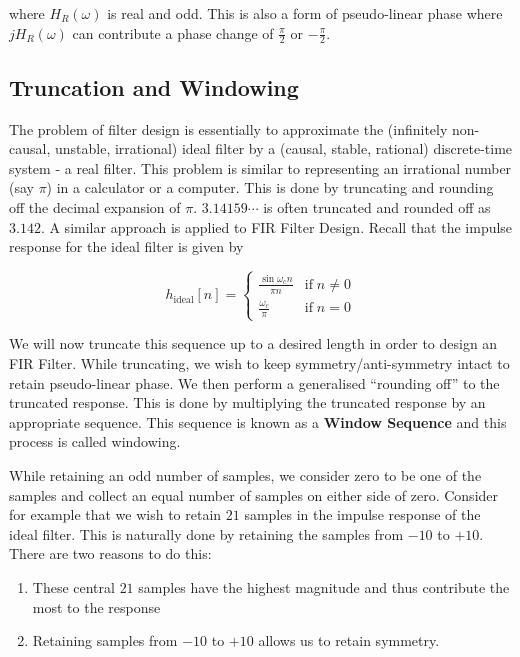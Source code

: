 \documentclass{article}
\theoremstyle{definition}
\newcommand\ddfrac[2]{\frac{\displaystyle #1}{\displaystyle #2}}
\begin{document}
where $H_R(\omega)$ is real and odd. This is also a form of pseudo-linear phase where $j H_R(\omega)$ can contribute a phase change of $\frac{\pi}{2}$ or $-\frac{\pi}{2}$. 

\subsection{Truncation and Windowing}

The problem of filter design is essentially to approximate the (infinitely non-causal, unstable, irrational) ideal filter by a (causal, stable, rational) discrete-time system - a real filter. This problem is similar to representing an irrational number (say $\pi$) in a calculator or a computer. This is done by truncating and rounding off the decimal expansion of $\pi$. $3.14159 \cdots$ is often truncated and rounded off as $3.142$. A similar approach is applied to FIR Filter Design. Recall that the impulse response for the ideal filter is given by

\[
    h_{\text{ideal}} [n] = 
    \begin{cases}
        \ddfrac{\sin \omega_c n}{\pi n} & \text{if} \; n \neq 0 \\
        \ddfrac{\omega_c}{\pi} & \text{if} \; n = 0
    \end{cases}
\]

We will now truncate this sequence up to a desired length in order to design an FIR Filter. While truncating, we wish to keep symmetry/anti-symmetry intact to retain pseudo-linear phase. We then perform a generalised ``rounding off'' to the truncated response. This is done by multiplying the truncated response by an appropriate sequence. This sequence is known as a \textbf{Window Sequence} and this process is called windowing. \medskip

While retaining an odd number of samples, we consider zero to be one of the samples and collect an equal number of samples on either side of zero. Consider for example that we wish to retain $21$ samples in the impulse response of the ideal filter. This is naturally done by retaining the samples from $-10$ to $+10$. There are two reasons to do this:
\begin{enumerate}
    \item These central $21$ samples have the highest magnitude and thus contribute the most to the response
    \item Retaining samples from $-10$ to $+10$ allows us to retain symmetry.
\end{enumerate}
\end{document}
